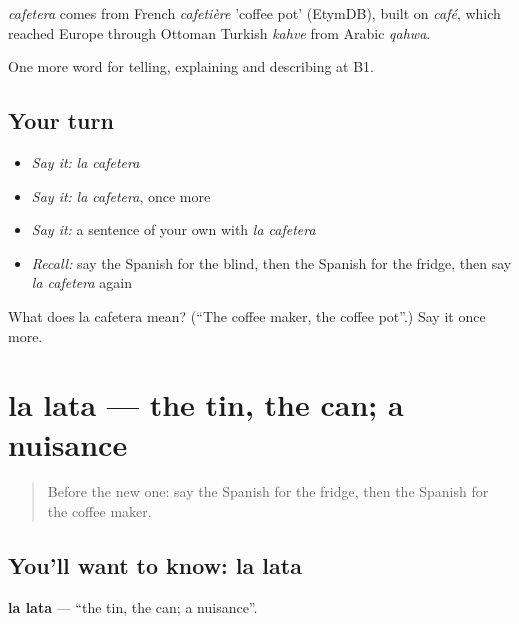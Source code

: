 \begin{cousinweb}
\emph{cafetera} comes from French \emph{cafetière} 'coffee pot' (EtymDB), built on \emph{café}, which reached Europe through Ottoman Turkish \emph{kahve} from Arabic \emph{qahwa}.
\end{cousinweb}

\begin{grammarlens}[title={What you've built}]
One more word for telling, explaining and describing at B1.
\end{grammarlens}

\subsection*{Your turn}
\begin{itemize}
\raggedright
  \item \emph{Say it:} \emph{la cafetera}
  \item \emph{Say it:} \emph{la cafetera}, once more
  \item \emph{Say it:} a sentence of your own with \emph{la cafetera}
  \item \emph{Recall:} say the Spanish for the blind, then the Spanish for the fridge, then say \emph{la cafetera} again
\end{itemize}

\begin{tcolorbox}[breakable,colback=teal!4,colframe=teal!35!black,title={Before you move on}]
What does la cafetera mean? (\textquotedblleft{}The coffee maker, the coffee pot\textquotedblright{}.) Say it once more.
\end{tcolorbox}
\section[la lata]{la lata — the tin, the can; a nuisance}

\label{lesson:ES-C775-lata}



\begin{quote}
Before the new one: say the Spanish for the fridge, then the Spanish for the coffee maker.
\end{quote}

\subsection*{You'll want to know: la lata}
\textbf{la lata} — \textquotedblleft{}the tin, the can; a nuisance\textquotedblright{}.

